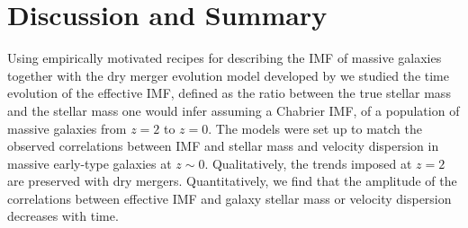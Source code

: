 \documentclass[usenatbib, letters]{mnras}
\begin{document}




\section{Discussion and Summary}\label{sect:discuss} 

Using empirically motivated recipes for describing the IMF of massive galaxies together with the dry merger evolution model developed by \citet{Nip++12} we studied the time evolution of the effective IMF, defined as the ratio between the true stellar mass and the stellar mass one would infer assuming a Chabrier IMF, of a population of massive galaxies from $z=2$ to $z=0$.
The models were set up to match the observed correlations between IMF and stellar mass and velocity dispersion in massive early-type galaxies at $z\sim0$.
Qualitatively, the trends imposed at $z=2$ are preserved with dry mergers. Quantitatively, we find that the amplitude of the correlations between effective IMF and galaxy stellar mass or velocity dispersion decreases with time.
\end{document}
